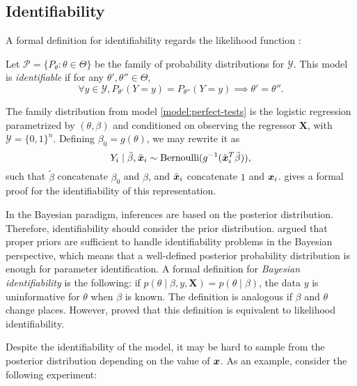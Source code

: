 \subsection{Identifiability}
\label{sec:perfect-test-identifiability}

A formal definition for identifiability regards the likelihood function \cite[p.
  3459]{xie2006measures}:

\begin{definition}
  \label{def:identifiability}
  Let $\mathcal{P} = \{P_{\theta} : \theta \in \Theta\}$ be
  the family of probability distributions for $\mathcal{Y}$. This model is
    {\em identifiable} if for any $\theta', \theta'' \in
    \Theta$,
  $$\forall y \in \mathcal{Y}, P_{\theta'}(Y = y) =
    P_{\theta''}(Y = y) \implies
    \theta' = \theta''.$$
\end{definition}

The family distribution from model \eqref{model:perfect-tests} is the logistic
regression parametrized by $(\theta, \beta)$ and conditioned on
observing the regressor $\boldsymbol{X}$, with $\mathcal{Y} = \{0,1\}^n$. Defining $\beta_0 =
  g(\theta)$, we may rewrite it as
$$Y_i \mid \tilde{\beta}, \tilde{\boldsymbol{x}}_i \sim \operatorname{Bernoulli}(g^{-1}(\tilde{\boldsymbol{x}}_i^T\tilde{\beta})),$$
such that $\tilde{\beta}$ concatenate $\beta_0$ and $\beta$, and $\tilde{\boldsymbol{x}}_i$
concatenate $1$ and $\boldsymbol{x}_i$. \textcite[p. 7]{kuchenhoff1995identification}
gives a formal proof for the identifiability of this representation.

In the Bayesian paradigm, inferences are based on the posterior distribution.
Therefore, identifiability should consider the prior distribution.
\textcite[p. 46]{lindley1972bayesian}  argued that proper priors are
sufficient to handle
identifiability problems in the Bayesian perspective, which means that a
well-defined posterior probability distribution is enough for parameter
identification. A formal definition for {\em Bayesian identifiability} is the
following: if $p(\theta \mid \beta, y, \boldsymbol{X}) = p(\theta \mid
  \beta)$, the data $y$ is uninformative for $\theta$ when $\beta$ is known.
The definition is analogous if $\beta$ and $\theta$ change places. However,
\textcite[p. 248]{gelfand1999identifiability} proved that this definition is equivalent to
likelihood identifiability.

Despite the identifiability of the model, it may be hard to sample from
the posterior distribution depending on the value of $\boldsymbol{x}$. As an example,
consider the following experiment:

